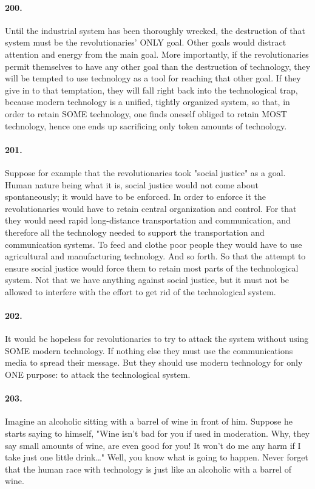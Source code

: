 \documentclass[12pt]{book}
\begin{document}
\paragraph{200.} Until the industrial system has been thoroughly wrecked, the destruction of that system must be the revolutionaries' ONLY goal. Other goals would distract attention and energy from the main goal. More importantly, if the revolutionaries permit themselves to have any other goal than the destruction of technology, they will be tempted to use technology as a tool for reaching that other goal. If they give in to that temptation, they will fall right back into the technological trap, because modern technology is a unified, tightly organized system, so that, in order to retain SOME technology, one finds oneself obliged to retain MOST technology, hence one ends up sacrificing only token amounts of technology.


\paragraph{201.}  Suppose for example that the revolutionaries took "social justice" as a goal. Human nature being what it is, social justice would not come about spontaneously; it would have to be enforced. In order to enforce it the revolutionaries would have to retain central organization and control. For that they would need rapid long-distance transportation and communication, and therefore all the technology needed to support the transportation and communication systems. To feed and clothe poor people they would have to use agricultural and manufacturing technology. And so forth. So that the attempt to ensure social justice would force them to retain most parts of the technological system. Not that we have anything against social justice, but it must not be allowed to interfere with the effort to get rid of the technological system.


\paragraph{202.}  It would be hopeless for revolutionaries to try to attack the system without using SOME modern technology. If nothing else they must use the communications media to spread their message. But they should use modern technology for only ONE purpose: to attack the technological system.


\paragraph{203.}  Imagine an alcoholic sitting with a barrel of wine in front of him.  Suppose he starts saying to himself, "Wine isn't bad for you if used in moderation. Why, they say small amounts of wine, are even good for you! It won't do me any harm if I take just one little drink\dots{}" Well, you know what is going to happen. Never forget that the human race with technology is just like an alcoholic with a barrel of wine.
\end{document}
